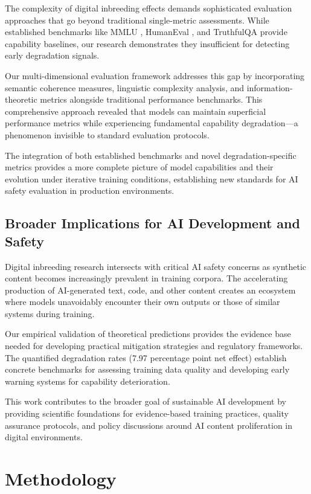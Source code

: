 \documentclass{article}
\begin{document}
The complexity of digital inbreeding effects demands sophisticated evaluation approaches that go beyond traditional single-metric assessments. While established benchmarks like MMLU \citep{hendrycks2020measuring}, HumanEval \citep{chen2021evaluating}, and TruthfulQA \citep{lin2022truthfulqa} provide capability baselines, our research demonstrates they insufficient for detecting early degradation signals.

Our multi-dimensional evaluation framework addresses this gap by incorporating semantic coherence measures, linguistic complexity analysis, and information-theoretic metrics alongside traditional performance benchmarks. This comprehensive approach revealed that models can maintain superficial performance metrics while experiencing fundamental capability degradation—a phenomenon invisible to standard evaluation protocols.

The integration of both established benchmarks and novel degradation-specific metrics provides a more complete picture of model capabilities and their evolution under iterative training conditions, establishing new standards for AI safety evaluation in production environments.

\subsection{Broader Implications for AI Development and Safety}

Digital inbreeding research intersects with critical AI safety concerns as synthetic content becomes increasingly prevalent in training corpora. The accelerating production of AI-generated text, code, and other content creates an ecosystem where models unavoidably encounter their own outputs or those of similar systems during training.

Our empirical validation of theoretical predictions provides the evidence base needed for developing practical mitigation strategies and regulatory frameworks. The quantified degradation rates (7.97 percentage point net effect) establish concrete benchmarks for assessing training data quality and developing early warning systems for capability deterioration.

This work contributes to the broader goal of sustainable AI development by providing scientific foundations for evidence-based training practices, quality assurance protocols, and policy discussions around AI content proliferation in digital environments.

\section{Methodology}
\end{document}
